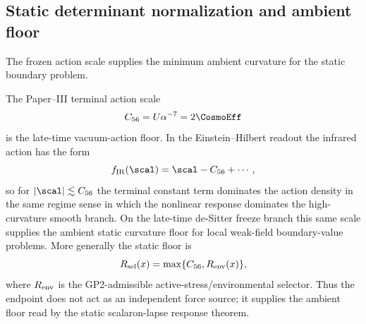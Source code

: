 \documentclass[12pt,a4paper]{article}
\begin{document}
\subsection{Static determinant normalization and ambient floor}
\label{p8:sec:rar_derivation}
\label{p8:sec:selfcon}
The frozen action scale supplies the minimum ambient curvature for the static boundary problem.

\begin{lemma}
\label{p8:lem:ir-action-dominance-ambient-floor}
The Paper--III terminal action scale
\begin{equation}
\label{p8:eq:ir-floor-R56}
C_{56}=U\alpha^{-7}=2\CosmoEff
\end{equation}
is the late-time vacuum-action floor.  In the Einstein--Hilbert readout the infrared action has the form
\begin{equation}
\label{p8:eq:ir-action-dominance-form}
f_{\rm IR}(\scal)=\scal-C_{56}+\cdots,
\end{equation}
so for \(|\scal|\lesssim C_{56}\) the terminal constant term dominates the action density in the same regime sense in which the nonlinear response dominates the high-curvature smooth branch.  On the late-time de-Sitter freeze branch this same scale supplies the ambient static curvature floor for local weak-field boundary-value problems.  More generally the static floor is
\begin{equation}
\label{p8:eq:ambient-selected-floor}
R_{\rm sel}(x)=\max\{C_{56},R_{\rm env}(x)\},
\end{equation}
where \(R_{\rm env}\) is the GP2-admissible active-stress/environmental selector.  Thus the endpoint does not act as an independent force source; it supplies the ambient floor read by the static scalaron-lapse response theorem.
\end{lemma}
\end{document}
